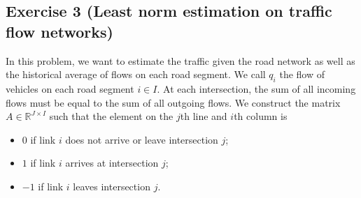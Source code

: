 \documentclass[11pt]{article}
\begin{document}
\newpage
\subsection*{Exercise 3 (Least norm estimation on traffic flow networks)}

In this problem, we want to estimate the traffic given the road network as well as the historical average of flows on each road segment. We call $q_i$ the flow of vehicles on each road segment $i\in I$. At each intersection, the sum of all incoming flows must be equal to the sum of all outgoing flows. We construct the matrix $A \in \mathbb{R}^{J\times I}$ such that the element on the $j$th line and $i$th column is
\begin{itemize}
\item $0$ if link $i$ does not arrive or leave intersection $j$;
\item $1$ if link $i$ arrives at intersection $j$;
\item $-1$ if link $i$ leaves intersection $j$.
\end{itemize}
\end{document}
